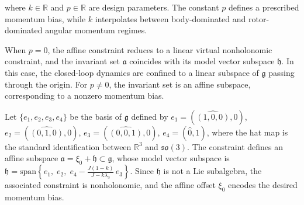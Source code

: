 \documentclass[letterpaper, 10 pt, conference]{ieeeconf}
\begin{document}
where $k\in\mathbb{R}$ and $p\in\mathbb{R}$ are design parameters. The constant $p$ defines a prescribed momentum bias, while $k$ interpolates between body-dominated and rotor-dominated angular momentum regimes. 

When $p=0$, the affine constraint reduces to a linear virtual nonholonomic constraint, and the invariant set $\mathfrak{a}$ coincides with its model vector subspace $\mathfrak{h}$. In this case, the closed-loop dynamics are confined to a linear subspace of $\mathfrak{g}$ passing through the origin. For $p\neq 0$, the invariant set is an affine subspace, corresponding to a nonzero momentum bias. %


Let $\{e_1,e_2,e_3,e_4\}$ be the basis of $\mathfrak{g}$ defined by $e_{1}=(\widehat{(1,0,0)},0)$, $e_{2}=(\widehat{(0,1,0)},0)$, $e_{3}=(\widehat{(0,0,1)},0)$, $e_{4}=(\hat{0},1)$, where the hat map is the standard identification between $\mathbb{R}^3$ and $\mathfrak{so}(3)$. The constraint defines an affine subspace $\mathfrak{a} = \xi_0 + \mathfrak{h} \subset \mathfrak{g}$, whose model vector subspace is $\displaystyle{\mathfrak{h}
=
\mathrm{span}
\left\{
e_{1},\;
e_{2},\;
e_{4} - \frac{J(1-k)}{J-k\lambda_{3}}\,e_{3}
\right\}}$. Since $\mathfrak{h}$ is not a Lie subalgebra, the associated constraint is nonholonomic, and the affine offset $\xi_0$ encodes the desired momentum bias.
\end{document}
